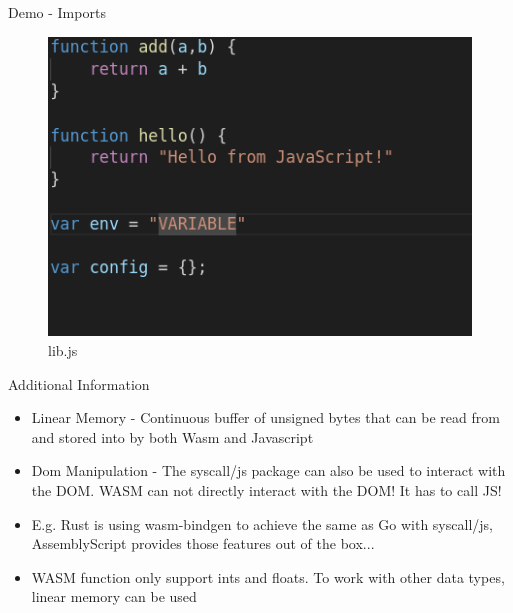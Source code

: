 \documentclass{beamer}
\begin{document}
\begin{frame}{Demo - Imports}
    \begin{figure}
        \includegraphics[scale=0.4]{./images/libjs.png}
        \caption{lib.js}
    \end{figure}

\end{frame}

\begin{frame}{Additional Information}
    \begin{itemize}
        \item Linear Memory - Continuous buffer of unsigned bytes that can be read from and stored into by both Wasm and Javascript
        \item Dom Manipulation - The syscall/js package can also be used to interact with the DOM. WASM can not directly interact with the DOM! It has to call JS!
        \item E.g. Rust is using wasm-bindgen to achieve the same as Go with syscall/js, AssemblyScript provides those features out of the box...
        \item WASM function only support ints and floats. To work with other data types, linear memory can be used
    \end{itemize}
\end{frame}
\end{document}
